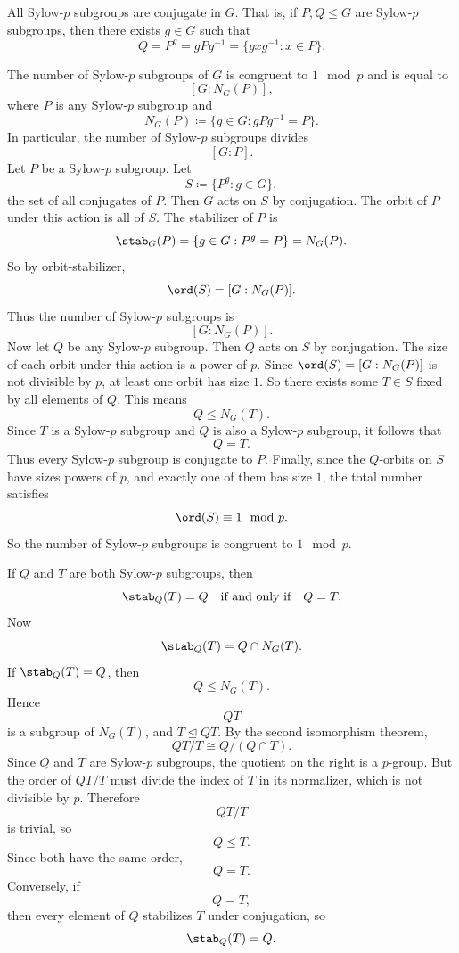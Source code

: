 \begin{theorem*}{
    All Sylow-$p$ subgroups are conjugate in $G$.
    That is, if $P,Q\leq G$ are Sylow-$p$ subgroups, then there exists $g\in G$ such that
    \[
        Q=P^g=gPg^{-1}=\{gxg^{-1}:x\in P\}.
    \]
}
\end{theorem*}

\begin{theorem}{
    The number of Sylow-$p$ subgroups of $G$ is congruent to $1\mod p$ and is equal to
    \[
        [G:N_G(P)],
    \]
    where $P$ is any Sylow-$p$ subgroup and
    \[
        N_G(P)\coloneqq \{g\in G:gPg^{-1}=P\}.
    \]
    In particular, the number of Sylow-$p$ subgroups divides
    \[
        [G:P].
    \]
}
    Let $P$ be a Sylow-$p$ subgroup.
    Let
    \[
        S\coloneqq \{P^g:g\in G\},
    \]
    the set of all conjugates of $P$.
    Then $G$ acts on $S$ by conjugation.
    The orbit of $P$ under this action is all of $S$.
    The stabilizer of $P$ is
    \[
        \stab_G(P)=\{g\in G:P^g=P\}=N_G(P).
    \]
    So by orbit-stabilizer,
    \[
        \ord(S)=[G:N_G(P)].
    \]
    Thus the number of Sylow-$p$ subgroups is
    \[
        [G:N_G(P)].
    \]
    Now let $Q$ be any Sylow-$p$ subgroup.
    Then $Q$ acts on $S$ by conjugation.
    The size of each orbit under this action is a power of $p$.
    Since $\ord(S)=[G:N_G(P)]$ is not divisible by $p$, at least one orbit has size $1$.
    So there exists some $T\in S$ fixed by all elements of $Q$.
    This means
    \[
        Q\leq N_G(T).
    \]
    Since $T$ is a Sylow-$p$ subgroup and $Q$ is also a Sylow-$p$ subgroup, it follows that
    \[
        Q=T.
    \]
    Thus every Sylow-$p$ subgroup is conjugate to $P$.
    Finally, since the $Q$-orbits on $S$ have sizes powers of $p$, and exactly one of them has size $1$, the total number satisfies
    \[
        \ord(S)\equiv 1\mod p.
    \]
    So the number of Sylow-$p$ subgroups is congruent to $1\mod p$.
\end{theorem}

\begin{lemma}{
    If $Q$ and $T$ are both Sylow-$p$ subgroups, then
    \[
        \stab_Q(T)=Q
        \quad\text{if and only if}\quad
        Q=T.
    \]
}
    Now
    \[
        \stab_Q(T)=Q\cap N_G(T).
    \]
    If $\stab_Q(T)=Q$, then
    \[
        Q\leq N_G(T).
    \]
    Hence
    \[
        QT
    \]
    is a subgroup of $N_G(T)$, and $T\trianglelefteq QT$.
    By the second isomorphism theorem,
    \[
        QT/T \cong Q/(Q\cap T).
    \]
    Since $Q$ and $T$ are Sylow-$p$ subgroups, the quotient on the right is a $p$-group.
    But the order of $QT/T$ must divide the index of $T$ in its normalizer, which is not divisible by $p$.
    Therefore
    \[
        QT/T
    \]
    is trivial, so
    \[
        Q\leq T.
    \]
    Since both have the same order,
    \[
        Q=T.
    \]
    Conversely, if
    \[
        Q=T,
    \]
    then every element of $Q$ stabilizes $T$ under conjugation, so
    \[
        \stab_Q(T)=Q.
    \]
\end{lemma}

